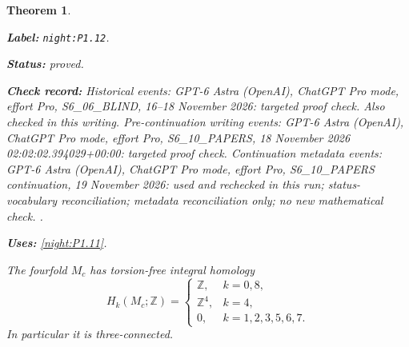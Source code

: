 \documentclass[11pt,a4paper]{article}
\newtheorem{theorem}{Theorem}[section]
\theoremstyle{definition}
\newcommand{\StatementRecord}[4]{\par\smallskip\begingroup\upshape\raggedright\noindent\textbf{Label:} \nolinkurl{#1}.\par\noindent\textbf{Status:} #2.\par\noindent\textbf{Check record:} #3.\par\noindent\textbf{Uses:} #4.\par\endgroup\smallskip}
\begin{document}
\begin{theorem}\label{night:P1.12}
\StatementRecord{night:P1.12}{proved}{Historical events: GPT-6 Astra (OpenAI), ChatGPT Pro mode, effort Pro, S6\_06\_BLIND, 16--18 November 2026: targeted proof check. Also checked in this writing. Pre-continuation writing events: GPT-6 Astra (OpenAI), ChatGPT Pro mode, effort Pro, S6\_10\_PAPERS, 18 November 2026 02:02:02.394029+00:00: targeted proof check. Continuation metadata events: GPT-6 Astra (OpenAI), ChatGPT Pro mode, effort Pro, S6\_10\_PAPERS continuation, 19 November 2026: used and rechecked in this run; status-vocabulary reconciliation; metadata reconciliation only; no new mathematical check. }{\cref{night:P1.11}}
The fourfold $M_c$ has torsion-free integral homology
\[
H_k(M_c;\mathbb Z)=
\begin{cases}
\mathbb Z,&k=0,8,\\
\mathbb Z^4,&k=4,\\
0,&k=1,2,3,5,6,7.
\end{cases}
\]
In particular it is three-connected.
\end{theorem}
\end{document}
